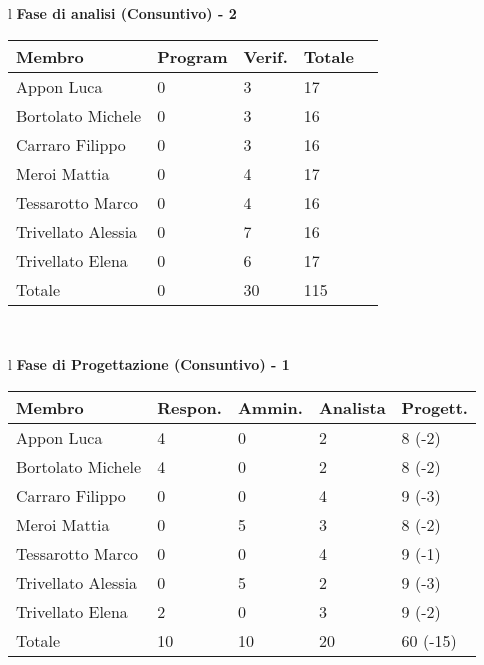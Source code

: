 \begin{table}[hbtp]
\large{
\begin{tabular}{l}
\Large{\textbf{\textsf{Fase di analisi (Consuntivo) - 2}}} \\
\begin{tabular}{||p{3.5cm}||p{2cm}||p{2cm}||p{2cm}||p{2cm}||}
\hline
\textbf{Membro} & \textbf{Program} & \textbf{Verif.} & \textbf{Totale}\\ \hline
{Appon Luca}&0&3&17 \\ \hline 
{Bortolato Michele} &0&3&16\\ \hline
{Carraro Filippo}&0&3&16 \\ \hline
{Meroi Mattia}&0&4&17\\ \hline
{Tessarotto Marco} &0&4&16\\ \hline
{Trivellato Alessia} &0&7&16 \\ \hline
{Trivellato Elena} &0&6&17 \\ \hline
{Totale} &0&30&115 \\ \hline
\end{tabular} \\
\end{tabular}
}
\end{table}


\begin{table}[hbtp]
\large{
\begin{tabular}{l}
\Large{\textbf{\textsf{Fase di Progettazione (Consuntivo) - 1}}} \\
\begin{tabular}{||p{3.5cm}||p{2cm}||p{2cm}||p{2cm}||p{2cm}||}
\hline

\textbf{Membro} & \textbf{Respon.} & \textbf{Ammin.} & \textbf{Analista}
& \textbf{Progett.}\\
\hline
{Appon Luca}&4&0&2&8 \footnotesize{(-2)} \\ 
\hline 
{Bortolato Michele} &4&0&2&8 \footnotesize{(-2)}\\ 
\hline
{Carraro Filippo}&0&0&4&9 \footnotesize{(-3)} \\
\hline
{Meroi Mattia}&0&5&3&8 \footnotesize{(-2)}\\
\hline
{Tessarotto Marco} &0&0&4&9 \footnotesize{(-1)}\\
\hline
{Trivellato Alessia} &0&5&2&9 \footnotesize{(-3)} \\
\hline
{Trivellato Elena} &2&0&3&9 \footnotesize{(-2)} \\
\hline
{Totale}& 10&10&20&60 \footnotesize{(-15)} \\
\hline

\end{tabular} \\
\end{tabular}
}
\end{table}

